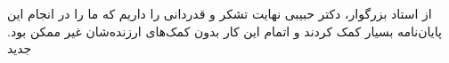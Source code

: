 


\begin{center}
\end{center}
از استاد بزرگوار، دکتر حبیبی نهایت تشکر و قدردانی را داریم که ما را در انجام این پایان‌نامه بسیار کمک کردند و اتمام این کار بدون کمک‌های ارزنده‌شان غیر ممکن بود. 
‌جدید

